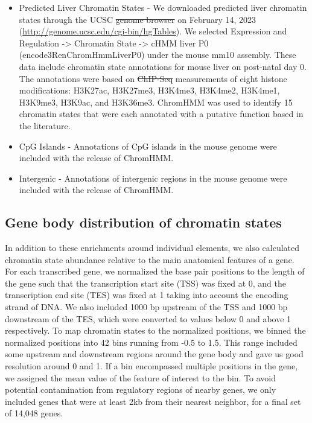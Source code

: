 \documentclass[
  11pt,
]{article}
\providecommand{\DIFaddtex}[1]{{\protect\color{blue}\uwave{#1}}} %
\providecommand{\DIFdeltex}[1]{{\protect\color{red}\sout{#1}}}                      %
\providecommand{\DIFaddbegin}{} %
\providecommand{\DIFaddend}{} %
\providecommand{\DIFdelbegin}{} %
\providecommand{\DIFdelend}{} %
\providecommand{\DIFadd}[1]{\texorpdfstring{\DIFaddtex{#1}}{#1}} %
\providecommand{\DIFdel}[1]{\texorpdfstring{\DIFdeltex{#1}}{}} %
\newcommand{\DIFscaledelfig}{0.5}
\newlength{\DIFdelgraphicswidth} %
\newlength{\DIFdelgraphicsheight} %
\newcommand{\DIFaddincludegraphics}[2][]{{\color{blue}\fbox{\DIFOincludegraphics[#1]{#2}}}} %
\newcommand{\DIFdelincludegraphics}[2][]{%
\sbox{\DIFdelgraphicsbox}{\DIFOincludegraphics[#1]{#2}}%
\settoboxwidth{\DIFdelgraphicswidth}{\DIFdelgraphicsbox} %
\settoboxtotalheight{\DIFdelgraphicsheight}{\DIFdelgraphicsbox} %
\scalebox{\DIFscaledelfig}{%
\parbox[b]{\DIFdelgraphicswidth}{\usebox{\DIFdelgraphicsbox}\\[-\baselineskip] \rule{\DIFdelgraphicswidth}{0em}}\llap{\resizebox{\DIFdelgraphicswidth}{\DIFdelgraphicsheight}{%
\setlength{\unitlength}{\DIFdelgraphicswidth}%
\begin{picture}(1,1)%
\thicklines\linethickness{2pt} %
{\color[rgb]{1,0,0}\put(0,0){\framebox(1,1){}}}%
{\color[rgb]{1,0,0}\put(0,0){\line( 1,1){1}}}%
{\color[rgb]{1,0,0}\put(0,1){\line(1,-1){1}}}%
\end{picture}%
}\hspace*{3pt}}} %
} %
\DeclareRobustCommand{\DIFaddbegin}{\DIFOaddbegin \let\includegraphics\DIFaddincludegraphics} %
\DeclareRobustCommand{\DIFaddend}{\DIFOaddend \let\includegraphics\DIFOincludegraphics} %
\DeclareRobustCommand{\DIFdelbegin}{\DIFOdelbegin \let\includegraphics\DIFdelincludegraphics} %
\DeclareRobustCommand{\DIFdelend}{\DIFOaddend \let\includegraphics\DIFOincludegraphics} %
\begin{document}
\begin{itemize}
\item
  Predicted Liver Chromatin States - We downloaded predicted liver
  chromatin states through the UCSC \DIFdelbegin \DIFdel{genome browser }\DIFdelend \DIFaddbegin \DIFadd{Genome Browser }\DIFaddend on February 14, 2023
  (\url{http://genome.ucsc.edu/cgi-bin/hgTables}). We selected
  Expression and Regulation -\textgreater{} Chromatin State
  -\textgreater{} cHMM liver P0 (encode3RenChromHmmLiverP0) under the
  mouse mm10 assembly. These data include chromatin state annotations
  for mouse liver on post-natal day 0. The annotations were based on
  \DIFdelbegin \DIFdel{ChIP-Seq }\DIFdelend \DIFaddbegin \DIFadd{ChIP-seq }\DIFaddend measurements of eight histone modifications: H3K27ac,
  H3K27me3, H3K4me3, H3K4me2, H3K4me1, H3K9me3, H3K9ac, and H3K36me3.
  ChromHMM was used to identify 15 chromatin states that were each
  annotated with a putative function based in the literature.
\item
  CpG Islands - Annotations of CpG islands in the mouse genome were
  included with the release of ChromHMM.
\item
  Intergenic - Annotations of intergenic regions in the mouse genome
  were included with the release of ChromHMM.
\end{itemize}

\hypertarget{gene-body-distribution-of-chromatin-states}{%
\subsection{Gene body distribution of chromatin
states}\label{gene-body-distribution-of-chromatin-states}}

In addition to these enrichments around individual elements, we also
calculated chromatin state abundance relative to the main anatomical
features of a gene. For each transcribed gene, we normalized the base
pair positions to the length of the gene such that the transcription
start site (TSS) was fixed at 0, and the transcription end site (TES)
was fixed at 1 taking into account the encoding strand of DNA. We also
included 1000 bp upstream of the TSS and 1000 bp downstream of the TES,
which were converted to values below 0 and above 1 respectively. To map
chromatin states to the normalized positions, we binned the normalized
positions into 42 bins running from -0.5 to 1.5. This range included
some upstream and downstream regions around the gene body and gave us
good resolution around 0 and 1. If a bin encompassed multiple positions
in the gene, we assigned the mean value of the feature of interest to
the bin. To avoid potential contamination from regulatory regions of
nearby genes, we only included genes that were at least 2kb from their
nearest neighbor, for a final set of 14,048 genes.
\end{document}

